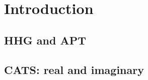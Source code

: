 \chapter{Introduction}
\label{chap:Intro}

\section{HHG and APT}
\label{intro_HHG}


\section{CATS: real and imaginary}
\label{into_theory_cats}



